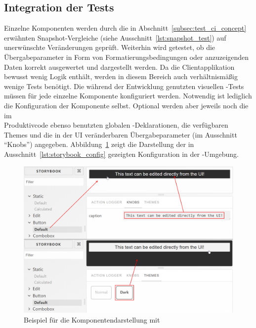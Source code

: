 \subsection{Integration der Tests}
Einzelne Komponenten werden durch die in Abschnitt~\ref{subsec:test_ci_concept} erwähnten Snapshot-Vergleiche (siehe Ausschnitt~\ref{lst:snapshot_test}) auf unerwünschte Veränderungen geprüft. Weiterhin wird getestet, ob die Übergabeparameter in Form von Formatierungsbedingungen oder anzuzeigenden Daten korrekt ausgewertet und dargestellt werden. Da die Clientapplikation bewusst wenig Logik enthält, werden in diesem Bereich auch verhältnismäßig wenige Tests benötigt.
Die während der Entwicklung genutzten visuellen -Tests müssen für jede einzelne Komponente konfiguriert werden. Notwendig ist lediglich die Konfiguration der Komponente selbst. Optional werden aber jeweils noch die im\\ Produktivcode ebenso benutzten globalen -Deklarationen, die verfügbaren Themes und die in der UI veränderbaren Übergabeparameter (im Ausschnitt \enquote{Knobs}) angegeben. Abbildung~\ref{fig:storybook_example} zeigt die Darstellung der in Ausschnitt~\ref{lst:storybook_config} gezeigten Konfiguration in der -Umgebung.





\begin{figure}
    \centering
    \captionsetup{justification=centering}
    \includegraphics[width=\textwidth]{figures/storybook_example.png}
        \caption{Beispiel für die Komponentendarstellung mit }\label{fig:storybook_example}
\end{figure}

